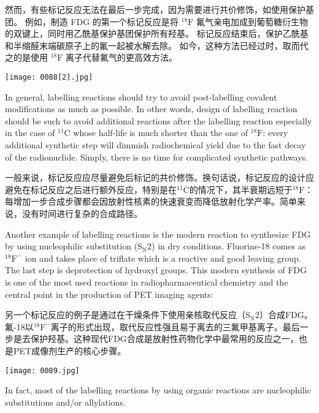 \documentclass[dvipsnames, svgnames,a4paper,11pt]{article}
\begin{document}
然而，有些标记反应无法在最后一步完成，因为需要进行共价修饰，如使用保护基团。 例如，制造 FDG 的第一个标记反应是将 ${}^{18}\mathrm{F}$ 氟气亲电加成到葡萄糖衍生物的双键上，同时用乙酰基保护基团保护所有羟基。 标记反应结束后，保护乙酰基和半缩醛末端碳原子上的氟一起被水解去除。 如今，这种方法已经过时，取而代之的是使用 ${}^{18}\mathrm{F}$ 离子代替氟气的更高效方法。

\begin{figure*}[h]
    \centering
    \texttt{[image: 0088[2].jpg]}
\end{figure*}

In general, labelling reactions should try to avoid post-labelling covalent
modifications as much as possible. In other words, design of labelling reaction
should be such to avoid additional reactions after the labelling reaction especially in
the case of ${}^{11}\mathrm{C}$ whose half-life is much shorter than the one of ${}^{18}\mathrm{F}$: every additional
synthetic step will dimmish radiochemical yield due to the fast decay of the
radionuclide. Simply, there is no time for complicated synthetic pathways.

一般来说，标记反应应尽量避免后标记的共价修饰。换句话说，标记反应的设计应避免在标记反应之后进行额外反应，特别是在${}^{11}\mathrm{C}$的情况下，其半衰期远短于${}^{18}\mathrm{F}$：每增加一步合成步骤都会因放射性核素的快速衰变而降低放射化学产率。简单来说，没有时间进行复杂的合成路径。

Another example of labelling reactions is the modern reaction to synthesize FDG by
using nucleophilic substitution ($\mathrm{S_N2}$) in dry conditions. Fluorine-18 comes as ${}^{18}\mathrm{F^-}$ ion
and takes place of triflate which is a reactive and good leaving group. The last step is
deprotection of hydroxyl groups. This modern synthesis of FDG is one of the most
used reactions in radiopharmaceutical chemistry and the central point in the
production of PET imaging agents:

另一个标记反应的例子是通过在干燥条件下使用亲核取代反应（$\mathrm{S_N2}$）合成FDG。氟-18以${}^{18}\mathrm{F^-}$离子的形式出现，取代反应性强且易于离去的三氟甲基离子。最后一步是去保护羟基。这种现代FDG合成是放射性药物化学中最常用的反应之一，也是PET成像剂生产的核心步骤。

\begin{figure*}[h]
    \centering
    \texttt{[image: 0089.jpg]}
\end{figure*}

In fact, most of the labelling reactions by using organic reactions are nucleophilic
substitutions and/or allylations.
\end{document}
